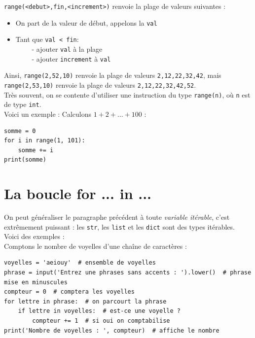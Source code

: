 \texttt{range(<debut>,fin,<increment>)} renvoie la plage de valeurs suivantes :
\begin{itemize}
    \item   On part de la valeur de début, appelons la \texttt{val}
    \item   Tant que \texttt{val < fin}:\\
    $\qquad$ - ajouter \texttt{val} à la plage\\
    $\qquad$ - ajouter \texttt{increment} à \texttt{val}
\end{itemize}
Ainsi, \texttt{range(2,52,10)} renvoie la plage de valeurs \texttt{2,12,22,32,42}, mais\\ \texttt{range(2,53,10)} renvoie la plage de valeurs 
\texttt{2,12,22,32,42,52}.\\

Très souvent, on se contente d'utiliser une instruction du type \texttt{range(n)}, où \texttt{n} est de type \texttt{int}.\\


Voici un exemple : Calculons $1+2+\ldots+100$ :

\begin{pyc}
\begin{verbatim}
somme = 0
for i in range(1, 101):
    somme += i
print(somme)
\end{verbatim}
\end{pyc}

\section{La boucle for ... in ...}

On peut généraliser le paragraphe précédent à toute \textit{variable itérable}, c'est extrêmement puissant : les \texttt{str}, les \texttt{list} et les 
\texttt{dict} sont des types itérables.\\

Voici des exemples :\\

Comptons le nombre de voyelles d'une chaîne de caractères :

\begin{pyc}
\begin{verbatim}
voyelles = 'aeiouy'  # ensemble de voyelles
phrase = input('Entrez une phrases sans accents : ').lower()  # phrase mise en minuscules
compteur = 0  # comptera les voyelles
for lettre in phrase:  # on parcourt la phrase
    if lettre in voyelles:  # est-ce une voyelle ?
        compteur += 1  # si oui on comptabilise
print('Nombre de voyelles : ', compteur)  # affiche le nombre
\end{verbatim}
\end{pyc}

